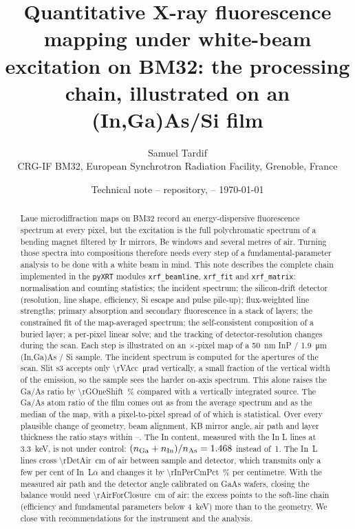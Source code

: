\documentclass[11pt,a4paper]{article}
\title{Quantitative X-ray fluorescence mapping under white-beam excitation on BM32:
the processing chain, illustrated on an (In,Ga)As/Si film}
\author{Samuel Tardif\\[2pt]
\small CRG-IF BM32, European Synchrotron Radiation Facility, Grenoble, France}
\date{\small Technical note -- \code{pyXRT} repository, \code{docs/xrf\_quantification} -- \today}
\newcommand{\code}[1]{\texttt{#1}}
\begin{document}
\maketitle

\begin{abstract}
\noindent
Laue microdiffraction maps on BM32 record an energy-dispersive fluorescence spectrum at every pixel, but
the excitation is the full polychromatic spectrum of a bending magnet filtered by Ir mirrors, Be windows
and several metres of air. Turning those spectra into compositions therefore needs every step of a
fundamental-parameter analysis to be done with a white beam in mind.
This note describes the complete chain implemented in the \code{pyXRT} modules
\code{xrf\_beamline}, \code{xrf\_fit} and \code{xrf\_matrix}: normalisation and counting statistics;
the incident spectrum; the silicon-drift detector (resolution, line shape, efficiency, Si escape
and pulse pile-up); flux-weighted line strengths; primary absorption and secondary fluorescence in a
stack of layers; the constrained fit of the map-averaged spectrum; the self-consistent composition of a
buried layer; a per-pixel linear solve; and the tracking of detector-resolution changes during the
scan. Each step is illustrated on an \rNSlow$\times$\rNFast-pixel map of a
\qty{50}{nm} InP / \qty{1.9}{\micro\metre} (In,Ga)As / Si sample.
The incident spectrum is computed for the apertures of the scan. Slit s3 accepts only
\qty{\rVAcc}{\micro\radian} vertically, a small fraction of the vertical width of the emission, so the
sample sees the harder on-axis spectrum. This alone raises the Ga/As ratio by \qty{\rGOneShift}{\percent}
compared with a vertically integrated source.
The Ga/As atom ratio of the film comes out as \rxGa{} from the average spectrum and
\rxMed{} as the median of the map, with a pixel-to-pixel spread of \rxSpread{} of which
\rxStat{} is statistical. Over every plausible change of geometry, beam alignment, KB mirror angle, air path and layer
thickness the ratio stays within
\rxGaMin--\rxGaMax. The In content, measured with the In L lines at
\qty{3.3}{keV}, is not under control: $(n_\mathrm{Ga}+n_\mathrm{In})/n_\mathrm{As}=1.468$
instead of~1. The In~L lines cross \qty{\rDetAir}{cm} of air between sample and detector, which
transmits only a few per cent of In~L$\alpha$ and changes it by \qty{\rInPerCmPct}{\percent} per
centimetre. With the measured air path and the detector angle calibrated on GaAs wafers, closing the
balance would need \qty{\rAirForClosure}{cm} of air: the excess points to the soft-line chain
(efficiency and fundamental parameters below \qty{4}{keV}) more than to the geometry.
We close with recommendations for the instrument and the analysis.
\end{abstract}
\end{document}
